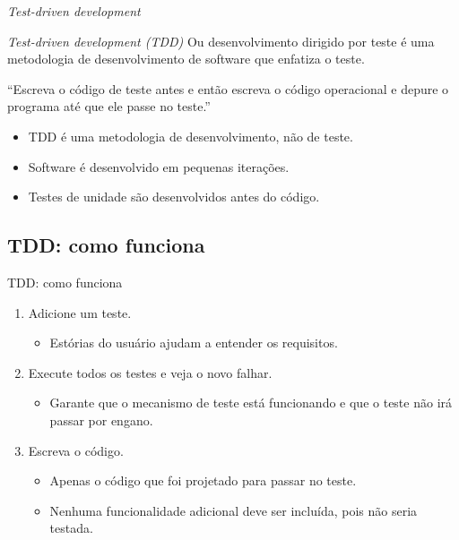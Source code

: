\documentclass[handout]{beamer}
\begin{document}
\begin{frame}{\textit{Test-driven development}}

\begin{block}{\textit{Test-driven development (TDD)}}
Ou desenvolvimento dirigido por teste é uma metodologia de desenvolvimento de software que enfatiza o teste.
\end{block}

``Escreva o código de teste antes e então escreva o código operacional e depure o programa até que ele passe no teste.''
\begin{itemize}
\item TDD é uma metodologia de desenvolvimento, não de teste.

\item Software é desenvolvido em pequenas iterações.

\item Testes de unidade são desenvolvidos antes do código.
\end{itemize}
\end{frame}

\subsection{TDD: como funciona}

\begin{frame}{TDD: como funciona}

\begin{enumerate}
\item Adicione um teste.
\begin{itemize}
\item Estórias do usuário ajudam a entender os requisitos.
\end{itemize}
\item Execute todos os testes e veja o novo falhar.
\begin{itemize}
\item Garante que o mecanismo de teste está funcionando e que o teste não irá passar por engano. 
\end{itemize}
\item Escreva o código.
\begin{itemize}
\item Apenas o código que foi projetado para passar no teste.
\item Nenhuma funcionalidade adicional deve ser incluída, pois não seria testada.
\end{itemize}
\end{enumerate}

\end{frame}
\end{document}
